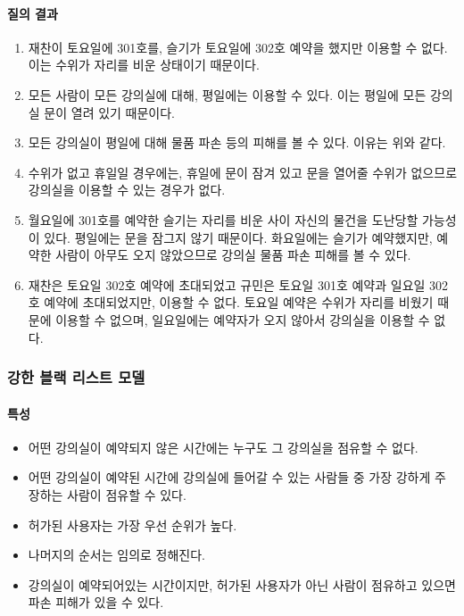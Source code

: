 \documentclass[11pt,a4paper]{article}
\begin{document}
\paragraph{질의 결과}
\begin{enumerate}
\item 재찬이 토요일에 301호를, 슬기가 토요일에 302호 예약을 했지만 이용할 수 없다. 이는 수위가 자리를 비운 상태이기 때문이다.
\item 모든 사람이 모든 강의실에 대해, 평일에는 이용할 수 있다. 이는 평일에 모든 강의실 문이 열려 있기 때문이다.
\item 모든 강의실이 평일에 대해 물품 파손 등의 피해를 볼 수 있다. 이유는 위와 같다.
\item 수위가 없고 휴일일 경우에는, 휴일에 문이 잠겨 있고 문을 열어줄 수위가 없으므로 강의실을 이용할 수 있는 경우가 없다.
\item 월요일에 301호를 예약한 슬기는 자리를 비운 사이 자신의 물건을 도난당할 가능성이 있다. 평일에는 문을 잠그지 않기 때문이다. 화요일에는 슬기가 예약했지만, 예약한 사람이 아무도 오지 않았으므로 강의실 물품 파손 피해를 볼 수 있다.
\item 재찬은 토요일 302호 예약에 초대되었고 규민은 토요일 301호 예약과 일요일 302호 예약에 초대되었지만, 이용할 수 없다. 토요일 예약은 수위가 자리를 비웠기 때문에 이용할 수 없으며, 일요일에는 예약자가 오지 않아서 강의실을 이용할 수 없다.
\end{enumerate}

\subsubsection{강한 블랙 리스트 모델}

\paragraph{특성}
\begin{itemize}
\item 어떤 강의실이 예약되지 않은 시간에는 누구도 그 강의실을 점유할 수 없다.
\item 어떤 강의실이 예약된 시간에 강의실에 들어갈 수 있는 사람들 중 가장 강하게 주장하는 사람이 점유할 수 있다.
\item 허가된 사용자는 가장 우선 순위가 높다.
\item 나머지의 순서는 임의로 정해진다.
\item 강의실이 예약되어있는 시간이지만, 허가된 사용자가 아닌 사람이 점유하고 있으면 파손 피해가 있을 수 있다.
\end{itemize}
\end{document}
